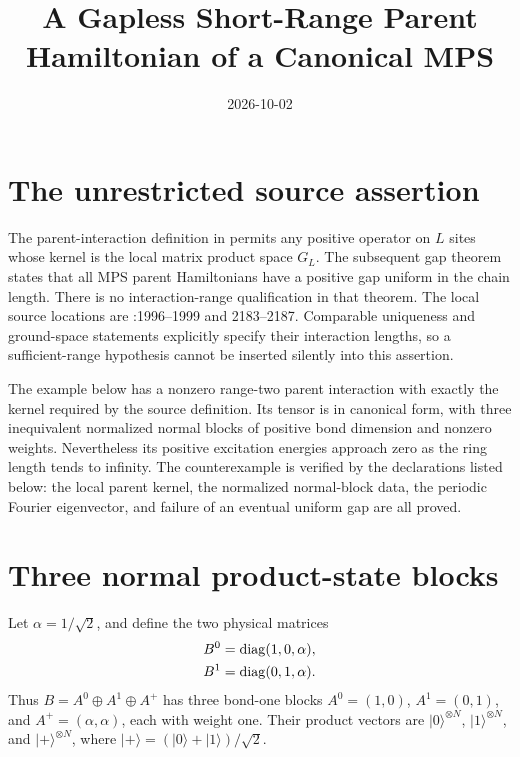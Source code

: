 \documentclass{article}
\title{A Gapless Short-Range Parent Hamiltonian of a Canonical MPS}
\author{}
\date{2026-10-02}
\begin{document}
\maketitle
{}

\section{The unrestricted source assertion}

The parent-interaction definition in
\cite[Section~IV.C]{Cirac2021Matrix} permits any positive operator on $L$
sites whose kernel is the local matrix product space $G_L$. The subsequent
gap theorem states that all MPS parent Hamiltonians have a positive gap
uniform in the chain length. There is no interaction-range qualification
in that theorem. The local source locations are
:1996--1999 and 2183--2187.
Comparable uniqueness and ground-space statements explicitly specify their
interaction lengths, so a sufficient-range hypothesis cannot be inserted
silently into this assertion.

The example below has a nonzero range-two parent interaction with exactly
the kernel required by the source definition. Its tensor is in canonical
form, with three inequivalent normalized normal blocks of positive bond
dimension and nonzero weights. Nevertheless its positive excitation
energies approach zero as the ring length tends to infinity.
The counterexample is verified by the declarations listed below: the local
parent kernel, the normalized normal-block data, the periodic Fourier
eigenvector, and failure of an eventual uniform gap are all proved.

\section{Three normal product-state blocks}

Let $\alpha=1/\sqrt2$, and define the two physical matrices
\begin{align}
    B^0&=\operatorname{diag}(1,0,\alpha),\notag\\
    B^1&=\operatorname{diag}(0,1,\alpha).
    \label{eq:short_range_parent_tensor}
\end{align}
Thus $B=A^0\oplus A^1\oplus A^+$ has three bond-one blocks
$A^0=(1,0)$, $A^1=(0,1)$, and $A^+=(\alpha,\alpha)$, each with weight one.
Their product vectors are $|0\rangle^{\otimes N}$,
$|1\rangle^{\otimes N}$, and $|+\rangle^{\otimes N}$, where
$|+\rangle=(|0\rangle+|1\rangle)/\sqrt2$.
\end{document}
